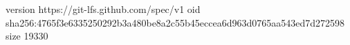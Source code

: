 version https://git-lfs.github.com/spec/v1
oid sha256:4765f3e6335250292b3a480be8a2c55b45eccea6d963d0765aa543ed7d272598
size 19330
